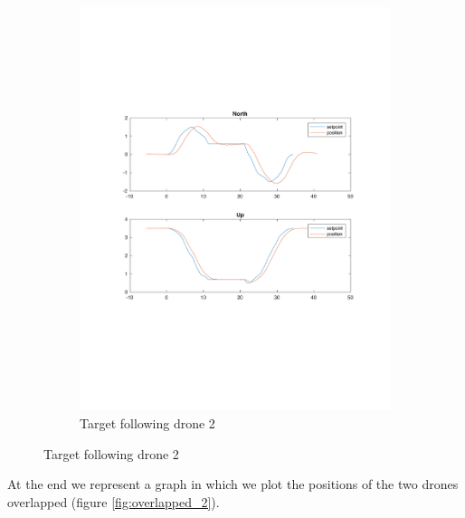 \begin{figure}
\begin{subfigure}[b]{0.8\textwidth}
   \includegraphics[width=1\linewidth]{chapters/chapter-04/figures/following_2_1.pdf}
   \caption{Target following drone 2}
   \label{fig:following_2_2}
\end{subfigure}
\end{figure}

At the end we represent a graph in which we plot the positions of the two drones overlapped
(figure \ref{fig:overlapped_2}).


